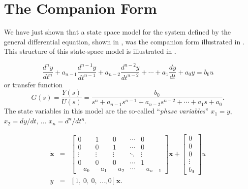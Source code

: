 \section*{The Companion Form}

We have just shown that a state space model
for the system defined by the general differential equation, shown
in , was the companion form illustrated in
. This structure of this state-space model is
illustrated in .
\begin{slide}\label{slide:l5s1}
\[ \frac{d^{n}y}{dt^{n}} +
a_{n-1}\frac{d^{n-1}y}{dt^{n-1}}+a_{n-2}\frac{d^{n-2}y}{dt^{n-2}}+\cdots+a_1\frac{dy}{dt}+a_0
y = b_0 u
\]
or transfer function
\begin{equation}\label{canon1}
G(s) = \frac{Y(s)}{U(s)} = \frac{b_0}{s^n +
a_{n-1}s^{n-1}+a_{n-2}s^{n-2}+\cdots+a_1s+a_0}.
\end{equation}
The state variables in this model are the so-called ``\emph{phase
variables}'' $x_1 = y$, $x_2 = dy/dt$, $\ldots$ $x_n = d^n/dt^n$.
\end{slide}
\begin{slide}\label{slide:l5s2}
\begin{eqnarray*} \dot{\mathbf{x}} &=&
\left[\begin{array}{ccccc}
  0 & 1 & 0 & \cdots & 0 \\
  0 & 0 & 1 & \cdots & 0 \\
  \vdots & \vdots & \vdots & \ddots & \vdots \\
  0 & 0 & 0 & \cdots & 1 \\
  -a_{0} & -a_{1} & -a_{2} & \cdots & -a_{n-1}
\end{array}\right]\mathbf{x}+\left[\begin{array}{c}
  0 \\
  0 \\
  0 \\
  \vdots \\
  b_0
\end{array}\right]u\\
y & = & [1,\ 0,\ 0,\ \ldots, 0] \mathbf{x}.
\end{eqnarray*}
\end{slide}
\begin{slide}\label{slide:l5s3}
\end{slide}

